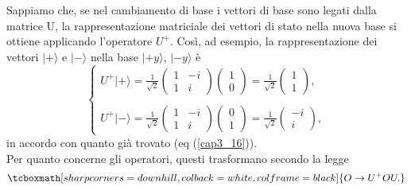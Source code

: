 Sappiamo che, se nel cambiamento di base i vettori di base sono legati dalla matrice U, la rappresentazione matriciale dei vettori di stato nella nuova base si ottiene applicando l'operatore $U^+$. Così, ad esempio, la rappresentazione dei vettori $| + \rangle $ e $| - \rangle $ nella base  $| +y \rangle $, $| -y \rangle $ è
	\begin{equation}
		\begin{cases}
		\displaystyle{U^+| + \rangle =\frac{1}{\sqrt{2}}
		\begin{pmatrix}
		1 & -i\\
		1 & i
		\end{pmatrix}
		\begin{pmatrix}
		1\\
		0
		\end{pmatrix}=
		\frac{1}{\sqrt{2}}
		\begin{pmatrix}
		1\\
		1
		\end{pmatrix} ,}\\
		\\
		\displaystyle{U^+| - \rangle =\frac{1}{\sqrt{2}}
		\begin{pmatrix}
		1 & -i\\
		1 & i
		\end{pmatrix}
		\begin{pmatrix}
		0\\
		1
		\end{pmatrix}=
		\frac{1}{\sqrt{2}}
		\begin{pmatrix}
		-i\\
		i
		\end{pmatrix} ,}
		\end{cases}
	\end{equation}
in accordo con quanto già trovato (eq (\ref{cap3_16})).\\

Per quanto concerne gli operatori, questi trasformano secondo la legge
	\begin{equation}
		\tcboxmath[sharp corners=downhill, colback=white, colframe=black]{
			O \rightarrow U^+OU .
			}
	\end{equation}\\
	
